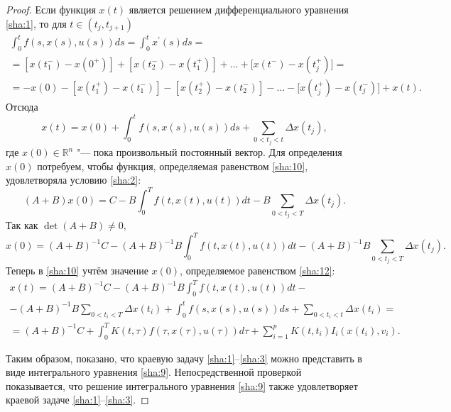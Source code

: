 \begin{proof} Если функция $x(t)$ является решением дифференциального уравнения \eqref{sha:1}, то для $t\in (t_{j} ,t_{j+1} )$
\begin{multline*}
\int _{0}^{t}f(s,x(s),u(s)) ds
=\int _{0}^{t}x^{\prime}(s)ds = \\ =\left[x(t_{1}^{-} )-x(0^{+} )\right]+\left[x(t_{2}^{-} )-x(t_{1}^{+} )\right]+\dots+\bigl[x(t^{-} )-x(t_{j}^{+} )\bigr]=
\\
=-x(0)-\left[x(t_{1}^{+} )-x(t_{1}^{-} )\right]-\left[x(t_{2}^{+} )-x(t_{2}^{-} )\right]-\dots-\bigl[x(t_{j}^{+} )-x(t_{j}^{-} )\bigr]+x(t).
\end{multline*}
Отсюда 
\begin{equation} \label{sha:10} 
x(t)=x(0)+\int _{0}^{t}f(s,x(s),u(s))ds +\sum _{0<t_{j} <t}\Delta x(t_{j} ) ,      
\end{equation} 
где $x(0)\in \mathbb R^{n}$ "--- пока произвольный постоянный вектор. 
Для определения $x(0)$ потребуем, чтобы функция, определяемая равенством \eqref{sha:10}, удовлетворяла условию \eqref{sha:2}:
\begin{equation} \label{sha:11} 
(A+B)x(0)=C-B\int _{0}^{T}f(t,x(t),u(t))dt -B\sum _{0<t_{j} <T}\Delta x(t_{j} ) .                                               
\end{equation} 
Так как $\det (A+B)\ne 0$, 
\begin{equation} \label{sha:12} 
x(0)=(A+B)^{-1} C-(A+B)^{-1} B\int _{0}^{T}f(t,x(t),u(t))dt -(A+B)^{-1} B\sum _{0<t_{j} <T}\Delta x(t_{j} ) .                                  
\end{equation} 
Теперь в \eqref{sha:10} учтём значение $x(0)$, определяемое равенством \eqref{sha:12}:
\begin{multline}
\label{sha:13} 
x(t)=(A+B)^{-1} C-(A+B)^{-1} B\int _{0}^{T}f(t,x(t),u(t))dt -
\\
-(A+B)^{-1} B\sum _{0<t_{i} <T}\Delta x(t_{i} ) + \int _{0}^{t}f(s,x(s),u(s))ds +\sum _{0<t_{i} <t}\Delta x(t_{i} ) = 
\\ 
=(A+B)^{-1} C+\int _{0}^{T}K(t,\tau )f(\tau ,x(\tau ),u(\tau))d\tau  +\sum _{i=1}^{p}K(t,t_{i} )I_{i} (x(t_{i} ),v_{i} ) .
\end{multline}

Таким образом, показано, что краевую задачу \eqref{sha:1}--\eqref{sha:3} можно представить в виде интегрального уравнения \eqref{sha:9}. 
Непосредственной проверкой показывается, что решение интегрального уравнения \eqref{sha:9} также удовлетворяет краевой задаче \eqref{sha:1}--\eqref{sha:3}. \end{proof}

